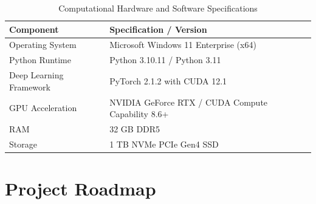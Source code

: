 \documentclass[12pt, a4paper]{report}
\begin{document}
\begin{table}[H]
\centering
\caption{Computational Hardware and Software Specifications}
\label{tab:hardware}
\begin{tabular}{ll}
\toprule
\textbf{Component} & \textbf{Specification / Version} \\
\midrule
Operating System & Microsoft Windows 11 Enterprise (x64) \\
Python Runtime & Python 3.10.11 / Python 3.11 \\
Deep Learning Framework & PyTorch 2.1.2 with CUDA 12.1 \\
GPU Acceleration & NVIDIA GeForce RTX / CUDA Compute Capability 8.6+ \\
RAM & 32 GB DDR5 \\
Storage & 1 TB NVMe PCIe Gen4 SSD \\
\bottomrule
\end{tabular}
\end{table}

\newpage
\chapter{Project Roadmap}
\end{document}
